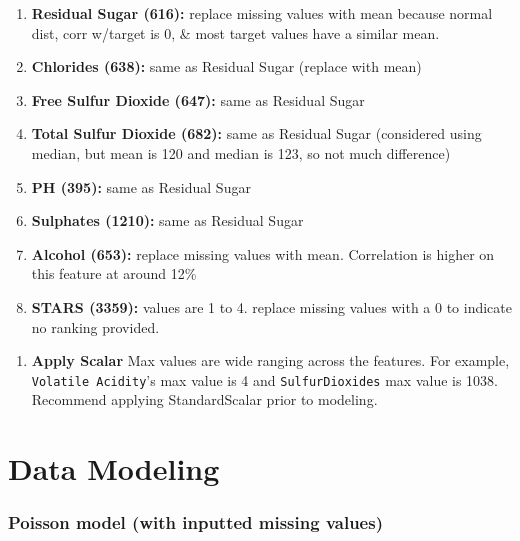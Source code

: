 \documentclass[]{elsarticle} %
\providecommand{\tightlist}{%
  \setlength{\itemsep}{0pt}\setlength{\parskip}{0pt}}
\begin{document}
\begin{enumerate}
\def\labelenumi{\alph{enumi}.}
\tightlist
\item
  \textbf{Residual Sugar (616):} replace missing values with mean
  because normal dist, corr w/target is 0, \& most target values have a
  similar mean. 
\item
  \textbf{Chlorides (638):} same as Residual Sugar (replace with mean)
\item
  \textbf{Free Sulfur Dioxide (647):} same as Residual Sugar 
\item
  \textbf{Total Sulfur Dioxide (682):} same as Residual Sugar
  (considered using median, but mean is 120 and median is 123, so not
  much difference) 
\item
  \textbf{PH (395):} same as Residual Sugar 
\item
  \textbf{Sulphates (1210):} same as Residual Sugar\\
\item
  \textbf{Alcohol (653):} replace missing values with mean. Correlation
  is higher on this feature at around 12\% 
\item
  \textbf{STARS (3359):} values are 1 to 4. replace missing values with
  a 0 to indicate no ranking provided. 
\end{enumerate}

\begin{enumerate}
\def\labelenumi{\arabic{enumi}.}
\setcounter{enumi}{1}
\tightlist
\item
  \textbf{Apply Scalar} Max values are wide ranging across the features.
  For example, \texttt{Volatile\ Acidity}'s max value is 4 and
  \texttt{SulfurDioxide\textquotesingle{}s} max value is 1038. Recommend
  applying StandardScalar prior to modeling.
\end{enumerate}

\newpage

\hypertarget{data-modeling}{%
\section{Data Modeling}\label{data-modeling}}

\hypertarget{poisson-model-with-inputted-missing-values}{%
\subsubsection{Poisson model (with inputted missing
values)}\label{poisson-model-with-inputted-missing-values}}
\end{document}

